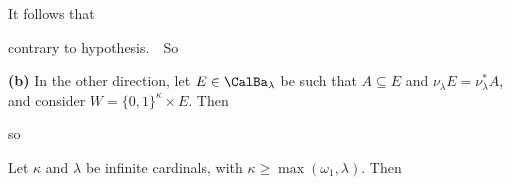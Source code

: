 {\noindent It follows that


\noindent contrary to hypothesis.\ \BanG\  So



\medskip

{\bf (b)} In the other direction, let $E\in\CalBa_{\lambda}$ be such that
$A\subseteq E$ and $\nu_{\lambda}E=\nu_{\lambda}^*A$, and consider
$W=\{0,1\}^{\kappa}\times E$.   Then


\noindent so

}%

 Let $\kappa$ and $\lambda$ be infinite
cardinals, with $\kappa\ge\max(\omega_1,\lambda)$.
Then


